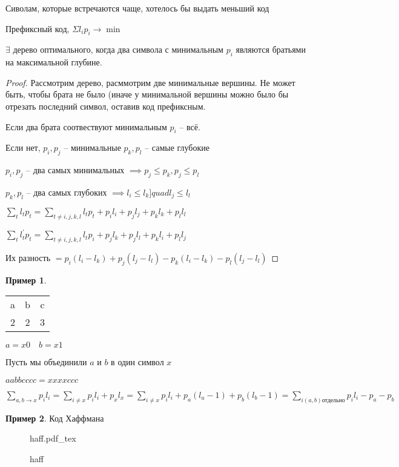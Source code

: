\documentclass{book}
\newcommand{\p}[1]{#1^{\prime}}
\theoremstyle{definition}
\newtheorem*{example}{Пример}
\newcommand{\incfig}[1]{%
    \def\svgwidth{\columnwidth}
    {#1.pdf_tex}
}
\begin{document}
Сиволам, которые встречаются чаще, хотелось бы выдать меньший код
\begin{problem}
    Префиксный код, $\Sigma l_ip_i \to \min$
\end{problem}
\begin{lemma}
    [1]
    $\exists $ дерево оптимального, когда два символа с минимальным $p_i$ являются братьями на максимальной глубине.
\end{lemma}
\begin{proof}
    Рассмотрим дерево, расммотрим две минимальные вершины. Не может быть, чтобы брата не было (иначе у минимальной вершины можно было бы отрезать последний символ, оставив код префиксным.

    Если два брата соотвествуют минимальным $p_i$ -- всё.

    Если нет,  $p_i, p_j$ -- минимальные  $p_k, p_l$ -- самые глубокие

     $p_i, p_j$ -- два самых минимальных $ \implies p_j\leqslant p_k, p_j\leqslant p_l$

     $p_k, p_l$ -- два самых глубоких  $\implies l_i\leqslant l_k]quad l_j\leqslant l_l$

     $\sum_{t} l_tp_t = \sum_{t\neq i,j,k,l}l_tp_t+p_il_i+p_jl_j+p_kl_k+p_ll_l$ 

     $\sum_{t} \p l_tp_t = \sum_{t\neq i,j,k,l} l_tp_i+p_jl_k+p_jl_l+p_kl_i+p_ll_j$ 

     Их разность $= p_i(l_i-l_k) + p_j(l_j-l_l) - p_k(l_i-l_k) - p_l(l_j-l_l)$
\end{proof}
\begin{example}
    \begin{tabular}{ccc}
        a&b&c\\2&2&3\\
    \end{tabular}

    $a = x 0\quad b = x 1$

    Пусть мы объединили $a$ и  $b$  в один символ  $x$

     $aabbc c c c =x x x x c c c$

     $\sum_{a,b\to x}p_il_i = \sum_{i\neq x} p_il_i + p_xl_x = \sum_{i\neq x} p_il_i + p_a(l_a-1) + p_b(l_b-1) = \sum_{i(a,b)\text{отдельно}}p_il_i-p_a-p_b$
\end{example}

\begin{example}
    Код Хаффмана

\begin{figure}[ht]
    \centering
    \incfig{haff}
    \caption{haff}
    \label{fig:haff}
\end{figure}
\end{example}
\end{document}

